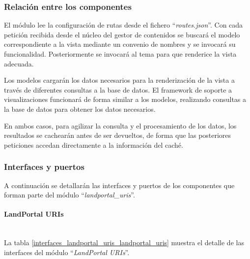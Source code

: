 \subsubsection{Relación entre los componentes}
El módulo lee la configuración de rutas desde el fichero ``\textit{routes.json}''.  Con cada petición recibida desde el núcleo del gestor de contenidos se buscará el modelo correspondiente a la vista mediante un convenio de nombres y se invocará su funcionalidad.  Posteriormente se invocará al tema para que renderice la vista adecuada.

Los modelos cargarán los datos necesarios para la renderización de la vista a través de diferentes consultas a la base de datos.  
El framework de soporte a visualizaciones funcionará de forma similar a los modelos, realizando consultas a la base de datos para obtener los datos necesarios.

En ambos casos, para agilizar la consulta y el procesamiento de los datos, los resultados se cachearán antes de ser devueltos, de forma que las posteriores peticiones accedan directamente a la información del caché.


\subsubsection{Interfaces y puertos}
A continuación se detallarán las interfaces y puertos de los componentes que forman parte del módulo ``\textit{landportal\_uris}''.

\paragraph{LandPortal URIs} \hfill \\
La tabla \ref{interfaces_landportal_uris_landportal_uris} muestra el detalle de las interfaces del módulo ``\textit{LandPortal URIs}''.  

